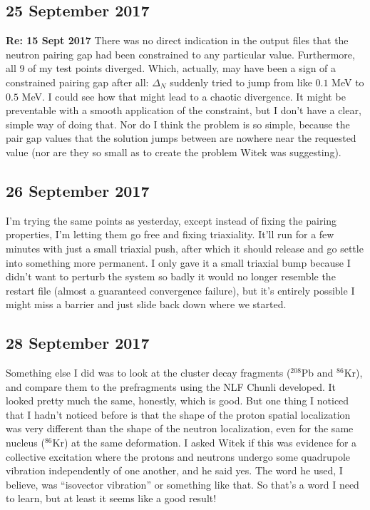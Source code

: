 \subsection*{25 September 2017}
\textbf{Re: 15 Sept 2017} There was no direct indication in the output files that the neutron pairing gap had been constrained to any particular value. Furthermore, all 9 of my test points diverged. Which, actually, may have been a sign of a constrained pairing gap after all: $\Delta_N$ suddenly tried to jump from like $0.1$ MeV to $0.5$ MeV. I could see how that might lead to a chaotic divergence. It might be preventable with a smooth application of the constraint, but I don't have a clear, simple way of doing that. Nor do I think the problem is so simple, because the pair gap values that the solution jumps between are nowhere near the requested value (nor are they so small as to create the problem Witek was suggesting).

\subsection*{26 September 2017}
I'm trying the same points as yesterday, except instead of fixing the pairing properties, I'm letting them go free and fixing triaxiality. It'll run for a few minutes with just a small triaxial push, after which it should release and go  settle into something more permanent. I only gave it a small triaxial bump because I didn't want to perturb the system so badly it would no longer resemble the restart file (almost a guaranteed convergence failure), but it's entirely possible I might miss a barrier and just slide back down where we started.

\subsection*{28 September 2017}
Something else I did was to look at the cluster decay fragments ($^{208}$Pb and $^{86}$Kr), and compare them to the prefragments using the NLF Chunli developed. It looked pretty much the same, honestly, which is good. But one thing I noticed that I hadn't noticed before is that the shape of the proton spatial localization was very different than the shape of the neutron localization, even for the same nucleus ($^{86}$Kr) at the same deformation. I asked Witek if this was evidence for a collective excitation where the protons and neutrons undergo some quadrupole vibration independently of one another, and he said yes. The word he used, I believe, was ``isovector vibration'' or something like that. So that's a word I need to learn, but at least it seems like a good result!

